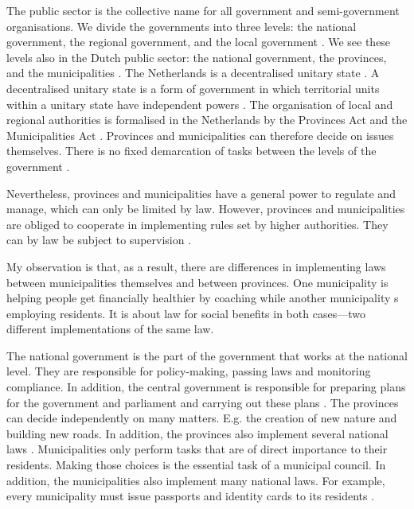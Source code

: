 The public sector is the collective name for all government and semi-government organisations. We divide the governments into three levels: the national government, the regional government, and the local government \parencite{PrivacySense2016}. We see these levels also in the Dutch public sector: the national government, the provinces, and the municipalities \parencite{Overheidsvormen}. The Netherlands is a decentralised unitary state \parencite[p.~10]{Libert2016}. A decentralised unitary state is a form of government in which territorial units within a unitary state have independent powers \parencite{Grondwetb}. The organisation of local and regional authorities is formalised in the Netherlands by the Provinces Act and the Municipalities Act \parencite{Grondwet}. Provinces and municipalities can therefore decide on issues themselves. There is no fixed demarcation of tasks between the levels of the government \parencite{Grondwet}. 

Nevertheless, provinces and municipalities have a general power to regulate and manage, which can only be limited by law. However, provinces and municipalities are obliged to cooperate in implementing rules set by higher authorities. They can by law be subject to supervision \parencite{Grondwetb}.

My observation is that, as a result, there are differences in implementing laws between municipalities themselves and between provinces. One municipality is helping people get financially healthier by coaching while another municipality s employing residents. It is about law for social benefits in both cases—two different implementations of the same law.

The national government is the part of the government that works at the national level. They are responsible for policy-making, passing laws and monitoring compliance. In addition, the central government is responsible for preparing plans for the government and parliament and carrying out these plans \parencite{Takenrijksoverheid}.  The provinces can decide independently on many matters. E.g. the creation of new nature and building new roads. In addition, the provinces also implement several national laws \parencite{Takenprovincie}. Municipalities only perform tasks that are of direct importance to their residents. Making those choices is the essential task of a municipal council. In addition, the municipalities also implement many national laws. For example, every municipality must issue passports and identity cards to its residents \parencite{Takengemeente}. 

